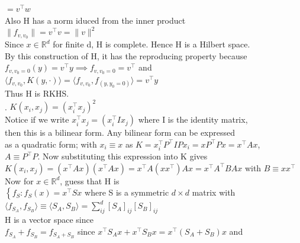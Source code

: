 \documentclass[18pt]{article}
\begin{document}
\begin{flushleft}
$=v^{\top}w$\\
\vspace{.4cm}
Also H has a norm iduced from the inner product\\
\vspace{.4cm}
$\parallel f_{v,v_0} \parallel=v^{\top}v=\parallel v\parallel^2$\\
\vspace{.4cm}
Since $x \in \mathbb{R}^d$ for finite d, H is complete. Hence H is a Hilbert space.\\
\vspace{.4cm}
By this construction of H, it has the reproducing property because\\
\vspace{.4cm}
$f_{v,v_0=0}(y)=v^{\top}y \implies f_{v,v_0=0}=v^{\top}$ and\\
$\langle f_{v,v_0},K(y,\cdot)\rangle=\langle f_{v,v_0},f_{(y,y_0=0)}\rangle=v^{\top}y$\\
\vspace{.4cm}
Thus H is RKHS.\\
. $K(x_i,x_j)=(x_i^{\top}x_j)^2$\\
\vspace{.4cm}
Notice if we write $x_i^{\top}x_j=(x_i^{\top} I x_j)$ where I is the identity matrix,\\
then this is a bilinear form. Any bilinear form can be expressed\\
as a quadratic form; with $x_i \equiv x$ as $K=x_i^{\top} P^{\top} I P x_i = x P^{\top} P x=x^{\top} A x$,\\
$A \equiv P^{\top}P$. Now substituting this expression into K gives\\
\vspace{.4cm}
$K(x_i,x_j)=(x^{\top}Ax)(x^{\top}Ax)=x^{\top}A (x x^{\top})Ax=x^{\top}A^{\top}BAx$ with $B\equiv x x^{\top}$\\
\vspace{.4cm}
Now for $x \in\mathbb{R}^d$, guess that H is\\
\vspace{.4cm}
$\left\{f_S: f_S(x)=x^{\top}Sx\right.$ where S is a symmetric $d\times d$ matrix with\\
$\langle f_{S_A},f_{S_B}\rangle \equiv \langle S_A,S_B\rangle=\sum\limits_{ij}^d[S_A]_{ij}[S_B]_{ij}$\\
\vspace{.4cm}
H is a vector space since\\
\vspace{.4cm}
$f_{S_A}+f_{S_B}=f_{S_A+S_B}$ since $x^{\top}S_Ax+x^{\top}S_Bx=x^{\top}(S_A+S_B)x$ and\\

\end{flushleft}
\end{document}
